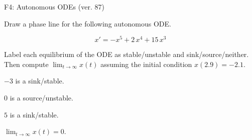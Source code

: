 \begin{exercise}
  \begin{exerciseTitle}F4: Autonomous ODEs (ver. 87)\end{exerciseTitle}
  \begin{exerciseStatement}
    

      Draw a phase line for the following 
      autonomous ODE.
    

    
\[x'= -x^{5} + 2 \, x^{4} + 15 \, x^{3}\]

    

      Label each equilibrium of the ODE
      as stable/unstable and sink/source/neither.
      Then compute \(\lim_{t\to\infty}x(t)\)
      assuming the initial condition
      \(x( 2.9 )= -2.1\).
    

  \end{exerciseStatement}
  \begin{exerciseAnswer}
    

      \(-3\) is a sink/stable.
      
        \(0\) is a source/unstable.
      
      \(5\) is a sink/stable.
    

    

      \(\lim_{t\to\infty}x(t)=0\).
    

  \end{exerciseAnswer}
\end{exercise}